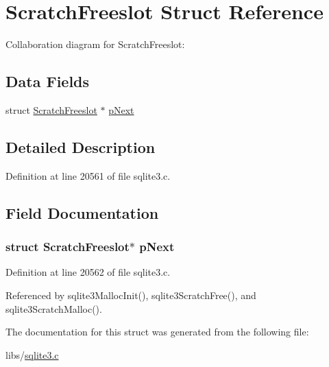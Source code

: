 \hypertarget{struct_scratch_freeslot}{}\section{Scratch\+Freeslot Struct Reference}
\label{struct_scratch_freeslot}


Collaboration diagram for Scratch\+Freeslot\+:
\subsection*{Data Fields}
\begin{DoxyCompactItemize}
\item 
struct \hyperlink{struct_scratch_freeslot}{Scratch\+Freeslot} $\ast$ \hyperlink{struct_scratch_freeslot_a2152c754bfa020fb3134866dbf86db98}{p\+Next}
\end{DoxyCompactItemize}


\subsection{Detailed Description}


Definition at line 20561 of file sqlite3.\+c.



\subsection{Field Documentation}
\hypertarget{struct_scratch_freeslot_a2152c754bfa020fb3134866dbf86db98}{}
\subsubsection[{p\+Next}]{\setlength{\rightskip}{0pt plus 5cm}struct {\bf Scratch\+Freeslot}$\ast$ p\+Next}\label{struct_scratch_freeslot_a2152c754bfa020fb3134866dbf86db98}


Definition at line 20562 of file sqlite3.\+c.



Referenced by sqlite3\+Malloc\+Init(), sqlite3\+Scratch\+Free(), and sqlite3\+Scratch\+Malloc().



The documentation for this struct was generated from the following file\+:\begin{DoxyCompactItemize}
\item 
libs/\hyperlink{sqlite3_8c}{sqlite3.\+c}\end{DoxyCompactItemize}
